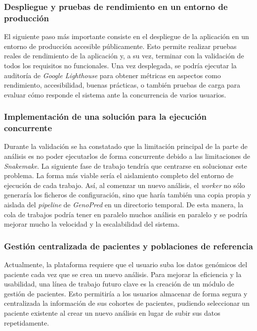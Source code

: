 \subsubsection{Despliegue y pruebas de rendimiento en un entorno de producción}
El siguiente paso más importante consiste en el despliegue de la aplicación en un entorno de producción accesible públicamente. Esto  permite realizar pruebas reales de rendimiento de la aplicación y, a su vez, terminar con la validación de todos los requisitos no funcionales. Una vez desplegada, se podría ejecutar la auditoría de \textit{Google Lighthouse} para obtener métricas en aspectos como rendimiento, accesibilidad, buenas prácticas, o también pruebas de carga para evaluar cómo responde el sistema ante la concurrencia de varios usuarios.

\subsubsection{Implementación de una solución para la ejecución concurrente}
Durante la validación se ha constatado que la limitación principal de la parte de análisis es no poder ejecutarlos de forma concurrente debido a las limitaciones de \textit{Snakemake}. La siguiente fase de trabajo tendría que centrarse en solucionar este problema. La forma más viable sería el aislamiento completo del entorno de ejecución de cada trabajo. Así, al comenzar un nuevo análisis, el \textit{worker} no sólo generaría los ficheros de configuración, sino que haría también una copia propia y aislada del \textit{pipeline} de \textit{GenoPred} en un directorio temporal. De esta manera, la cola de trabajos podría tener en paralelo muchos análisis en paralelo y se podría mejorar mucho la velocidad y la escalabilidad del sistema.

\subsubsection{Gestión centralizada de pacientes y poblaciones de referencia}
Actualmente, la plataforma requiere que el usuario suba los datos genómicos del paciente cada vez que se crea un nuevo análisis. Para mejorar la eficiencia y la usabilidad, una línea de trabajo futuro clave es la creación de un módulo de gestión de pacientes. Esto permitiría a los usuarios almacenar de forma segura y centralizada la información de sus cohortes de pacientes, pudiendo seleccionar un paciente existente al crear un nuevo análisis en lugar de subir sus datos repetidamente.

